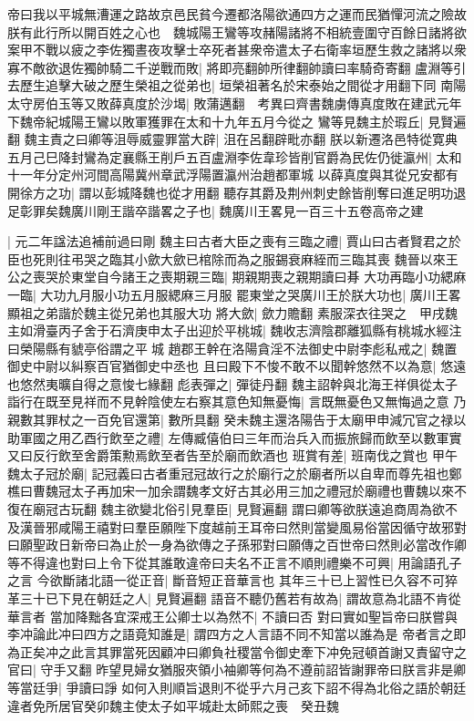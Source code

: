 帝曰我以平城無漕運之路故京邑民貧今遷都洛陽欲通四方之運而民猶憚河流之險故朕有此行所以開百姓之心也　魏城陽王鸞等攻赭陽諸將不相統壹圍守百餘日諸將欲案甲不戰以疲之李佐獨晝夜攻擊士卒死者甚衆帝遣太子右衛率垣歷生救之諸將以衆寡不敵欲退佐獨帥騎二千逆戰而敗|{
	將即亮翻帥所律翻帥讀曰率騎奇寄翻}
盧淵等引去歷生追擊大破之歷生榮祖之從弟也|{
	垣榮祖著名於宋泰始之間從才用翻下同}
南陽太守房伯玉等又敗薛真度於沙堨|{
	敗蒲邁翻　考異曰齊書魏虜傳真度敗在建武元年下魏帝紀城陽王鸞以敗軍獲罪在太和十九年五月今從之}
鸞等見魏主於瑕丘|{
	見賢遍翻}
魏主責之曰卿等沮辱威靈罪當大辟|{
	沮在呂翻辟毗亦翻}
朕以新遷洛邑特從寛典五月己巳降封鸞為定襄縣王削戶五百盧淵李佐韋珍皆削官爵為民佐仍徙瀛州|{
	太和十一年分定州河間高陽冀州章武浮陽置瀛州治趙都軍城}
以薛真度與其從兄安都有開徐方之功|{
	謂以彭城降魏也從才用翻}
聽存其爵及荆州刺史餘皆削奪曰進足明功退足彰罪矣魏廣川剛王諧卒諧畧之子也|{
	魏廣川王畧見一百三十五卷高帝之建}


|{
	元二年諡法追補前過曰剛}
魏主曰古者大臣之喪有三臨之禮|{
	賈山曰古者賢君之於臣也死則往弔哭之臨其小歛大歛已棺除而為之服錫衰麻絰而三臨其喪}
魏晉以來王公之喪哭於東堂自今諸王之喪期親三臨|{
	期親期喪之親期讀曰朞}
大功再臨小功緦麻一臨|{
	大功九月服小功五月服緦麻三月服}
罷東堂之哭廣川王於朕大功也|{
	廣川王畧顯祖之弟諧於魏主從兄弟也其服大功}
將大歛|{
	歛力贍翻}
素服深衣往哭之　甲戌魏主如滑臺丙子舍于石濟庚申太子出迎於平桃城|{
	魏收志濟陰郡離狐縣有桃城水經注曰榮陽縣有䝞亭俗謂之平城}
趙郡王幹在洛陽貪淫不法御史中尉李彪私戒之|{
	魏置御史中尉以糾察百官猶御史中丞也}
且曰殿下不悛不敢不以聞幹悠然不以為意|{
	悠遠也悠然夷曠自得之意悛七緣翻}
彪表彈之|{
	彈徒丹翻}
魏主詔幹與北海王祥俱從太子詣行在既至見祥而不見幹陰使左右察其意色知無憂悔|{
	言既無憂色又無悔過之意}
乃親數其罪杖之一百免官還第|{
	數所具翻}
癸未魏主還洛陽告于太廟甲申減冗官之禄以助軍國之用乙酉行飲至之禮|{
	左傳臧僖伯曰三年而治兵入而振旅歸而飲至以數軍實又曰反行飲至舍爵策勲焉飲至者告至於廟而飲酒也}
班賞有差|{
	班南伐之賞也}
甲午魏太子冠於廟|{
	記冠義曰古者重冠冠故行之於廟行之於廟者所以自卑而尊先祖也鄭樵曰曹魏冠太子再加宋一加余謂魏孝文好古其必用三加之禮冠於廟禮也曹魏以來不復在廟冠古玩翻}
魏主欲變北俗引見羣臣|{
	見賢遍翻}
謂曰卿等欲朕遠追商周為欲不及漢晉邪咸陽王禧對曰羣臣願陛下度越前王耳帝曰然則當變風易俗當因循守故邪對曰願聖政日新帝曰為止於一身為欲傳之子孫邪對曰願傳之百世帝曰然則必當改作卿等不得違也對曰上令下從其誰敢違帝曰夫名不正言不順則禮樂不可興|{
	用論語孔子之言}
今欲斷諸北語一從正音|{
	斷音短正音華言也}
其年三十已上習性已久容不可猝革三十已下見在朝廷之人|{
	見賢遍翻}
語音不聽仍舊若有故為|{
	謂故意為北語不肯從華言者}
當加降黜各宜深戒王公卿士以為然不|{
	不讀曰否}
對曰實如聖旨帝曰朕嘗與李冲論此冲曰四方之語竟知誰是|{
	謂四方之人言語不同不知當以誰為是}
帝者言之即為正矣冲之此言其罪當死因顧冲曰卿負社稷當令御史牽下冲免冠頓首謝又責留守之官曰|{
	守手又翻}
昨望見婦女猶服夾領小袖卿等何為不遵前詔皆謝罪帝曰朕言非是卿等當廷爭|{
	爭讀曰諍}
如何入則順旨退則不從乎六月己亥下詔不得為北俗之語於朝廷違者免所居官癸卯魏主使太子如平城赴太師熙之喪　癸丑魏

